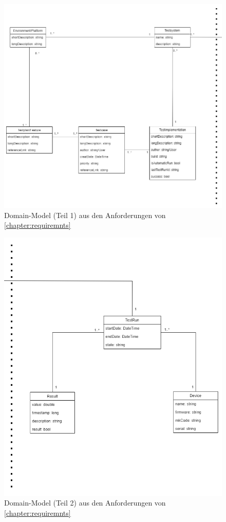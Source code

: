 \documentclass[a4paper, fontsize=11pt, parskip=half, twoside]{scrreprt}
\begin{document}
	\begin{figure}[H]
		\centering
		\includegraphics[scale=0.5]{assets/TCMS_DomainModel_part1.png}
		\caption{Domain-Model (Teil 1) aus den Anforderungen von \autoref{chapter:requiremnts}}
		\label{fig:domainModelPart1}
	\end{figure}


	\begin{figure}[H]
		\centering
		\includegraphics[scale=0.5]{assets/TCMS_DomainModel_part2.png}
		\caption{Domain-Model (Teil 2) aus den Anforderungen von \autoref{chapter:requiremnts}}
		\label{fig:domainModelPart2}
	\end{figure}
\end{document}
